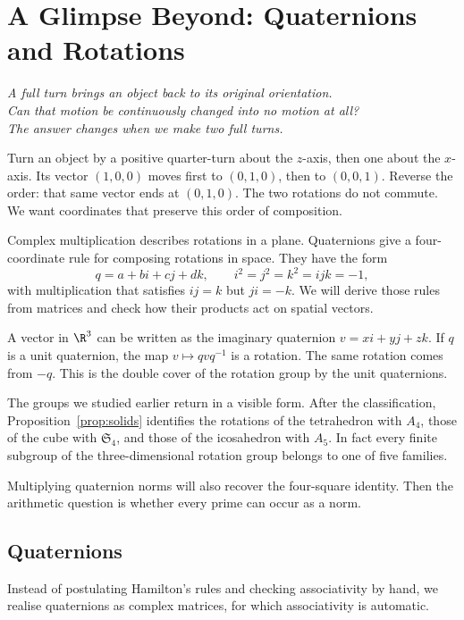 \chapter{A Glimpse Beyond: Quaternions and Rotations}

\begin{center}\itshape
A full turn brings an object back to its original orientation.\\
Can that motion be continuously changed into no motion at all?\\
The answer changes when we make two full turns.
\end{center}

Turn an object by a positive quarter-turn about the $z$-axis, then one about
the $x$-axis. Its vector $(1,0,0)$ moves first to $(0,1,0)$, then to $(0,0,1)$.
Reverse the order: that same vector ends at $(0,1,0)$. The two rotations do
not commute. We want coordinates that preserve this order of composition.

Complex multiplication describes rotations in a plane. Quaternions give a
four-coordinate rule for composing rotations in space. They have the form
\[
q=a+bi+cj+dk,\qquad i^2=j^2=k^2=ijk=-1,
\]
with multiplication that satisfies $ij=k$ but $ji=-k$. We will derive those
rules from matrices and check how their products act on spatial vectors.

A vector in $\R^3$ can be written as the imaginary quaternion $v=xi+yj+zk$. If $q$ is a unit quaternion, the map $v\mapsto qvq^{-1}$ is a rotation. The same rotation comes from $-q$. This is the double cover of the rotation group by the unit quaternions.

The groups we studied earlier return in a visible form. After the classification, Proposition~\ref{prop:solids} identifies the rotations of the tetrahedron with $A_4$, those of the cube with $\mathfrak S_4$, and those of the icosahedron with $A_5$. In fact every finite subgroup of the three-dimensional rotation group belongs to one of five families.

Multiplying quaternion norms will also recover the four-square identity.
Then the arithmetic question is whether every prime can occur as a norm.

\section{Quaternions}

Instead of postulating Hamilton's rules and checking associativity by hand, we realise quaternions as complex matrices, for which associativity is automatic.

